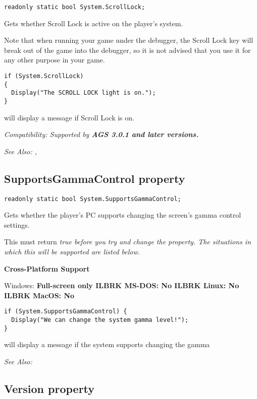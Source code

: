 \begin{verbatim}
readonly static bool System.ScrollLock;
\end{verbatim}
Gets whether Scroll Lock is active on the player's system.

Note that when running your game under the debugger, the Scroll Lock key will break
out of the game into the debugger, so it is not advised that you use it for any
other purpose in your game.

\begin{verbatim}
if (System.ScrollLock)
{
  Display("The SCROLL LOCK light is on.");
}
\end{verbatim}
will display a message if Scroll Lock is on.

\it{Compatibility:} Supported by \bf{AGS 3.0.1} and later versions.

\it{See Also:} ,


\subsection{SupportsGammaControl property}\label{System.SupportsGammaControl}%

\begin{verbatim}
readonly static bool System.SupportsGammaControl;
\end{verbatim}
Gets whether the player's PC supports changing the screen's gamma control settings.

This must return \it{true} before you try and change the  property.
The situations in which this will be supported are listed below.

\bf{Cross-Platform Support}

Windows: \bf{ Full-screen only }ILBRK
MS-DOS: \bf{ No }ILBRK
Linux: \bf{ No }ILBRK
MacOS: \bf{ No }

\begin{verbatim}
if (System.SupportsGammaControl) {
  Display("We can change the system gamma level!");
}
\end{verbatim}
will display a message if the system supports changing the gamma

\it{See Also:} 


\subsection{Version property}\label{System.Version}%

